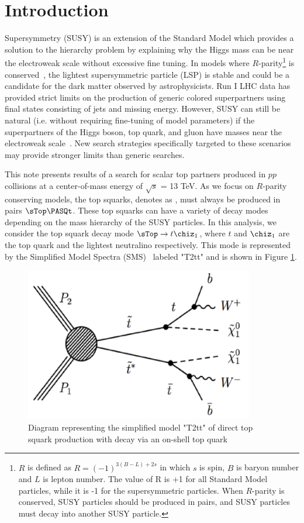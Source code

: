 \section{Introduction}

  Supersymmetry (SUSY) is an extension of the Standard Model which provides a solution to the hierarchy problem by explaining why the Higgs mass can be near the electroweak scale without
  excessive fine tuning. In models where $R$-parity\footnote{$R$ is defined as $R = (-1)^{3(B-L)+2s}$ in which $s$ is spin, $B$ is baryon number and $L$ is lepton number. The value
  of R is +1 for all Standard Model particles, while it is -1 for the supersymmetric particles. When $R$-parity is conserved, SUSY particles should be produced in pairs, and SUSY particles must decay into another SUSY particle.}
  is conserved~\cite{Wess:1974tw,Farrar:1978xj}, the lightest supersymmetric particle (LSP) is stable and could be a candidate for the dark matter observed by astrophysicists.
  Run I LHC data has provided strict limits on the production of generic colored superpartners using final states consisting of jets and missing energy. However, SUSY can still be natural (i.e. without 
  requiring fine-tuning of model parameters) if the
  superpartners of the Higgs boson, top quark, and gluon have masses near the electroweak scale~\cite{Barbieri:1987fn,deCarlos1993320,Dimopoulos1995573,Barbieri199676,Papucci:2011wy}. 
  New search strategies specifically targeted to these scenarios may provide stronger limits than generic searches.

  This note presents results of a search for scalar top partners produced in $pp$ collisions at a center-of-mass energy of $\sqrt{s}$ = 13 TeV. 
  As we focus on $R$-parity conserving models, the top squarks, denotes as \sTop, must always be produced in pairs $\sTop\PASQt$.
  These top squarks can have a variety of decay modes depending on the mass hierarchy of the SUSY particles. In this analysis, we consider the
  top squark decay mode $\sTop \to t\chiz_1$, where $t$ and $\chiz_1$ are the top quark and the lightest neutralino respectively. 
  This mode is represented by the Simplified Model Spectra (SMS)~\cite{Alwall:2008ag,Alwall:2008va,Alves:2011wf} labeled "T2tt" and is shown in Figure \ref{fig:T2tt}.

  \begin{figure}
    \centering\includegraphics[width=10cm]{figures/T2tt.png}
    \caption{Diagram representing the simplified model "T2tt" of direct top squark production with decay via an on-shell top quark}
    \label{fig:T2tt}
  \end{figure}

